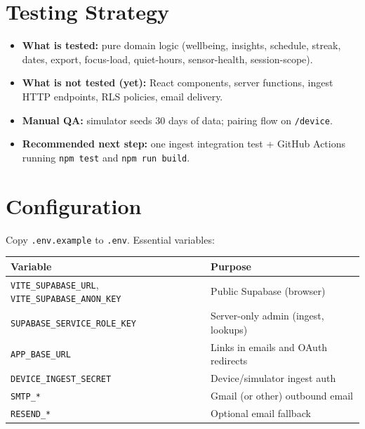 \documentclass[11pt,a4paper]{article}
\newcommand{\filepath}[1]{\texttt{#1}}
\begin{document}
\section{Testing Strategy}

\begin{itemize}[leftmargin=*]
  \item \textbf{What is tested:} pure domain logic (wellbeing, insights, schedule, streak,
        dates, export, focus-load, quiet-hours, sensor-health, session-scope).
  \item \textbf{What is not tested (yet):} React components, server functions, ingest HTTP
        endpoints, RLS policies, email delivery.
  \item \textbf{Manual QA:} simulator seeds 30 days of data; pairing flow on \filepath{/device}.
  \item \textbf{Recommended next step:} one ingest integration test + GitHub Actions running
        \texttt{npm test} and \texttt{npm run build}.
\end{itemize}

\section{Configuration}

Copy \filepath{.env.example} to \filepath{.env}. Essential variables:

\begin{table}[h]
\centering
\small
\begin{tabular}{@{}ll@{}}
\toprule
\textbf{Variable} & \textbf{Purpose} \\
\midrule
\texttt{VITE\_SUPABASE\_URL}, \texttt{VITE\_SUPABASE\_ANON\_KEY} & Public Supabase (browser) \\
\texttt{SUPABASE\_SERVICE\_ROLE\_KEY} & Server-only admin (ingest, lookups) \\
\texttt{APP\_BASE\_URL} & Links in emails and OAuth redirects \\
\texttt{DEVICE\_INGEST\_SECRET} & Device/simulator ingest auth \\
\texttt{SMTP\_*} & Gmail (or other) outbound email \\
\texttt{RESEND\_*} & Optional email fallback \\
\bottomrule
\end{tabular}
\end{table}
\end{document}
